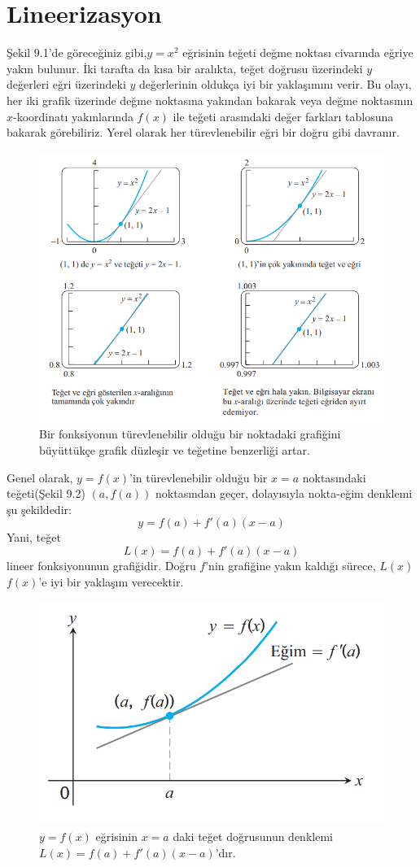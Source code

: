 \section{\protect Lineerizasyon}
Şekil 9.1'de göreceğiniz gibi,$y=x^2$ eğrisinin teğeti değme noktası civarında eğriye yakın bulunur. İki tarafta da kısa bir aralıkta, teğet doğrusu üzerindeki $y$ değerleri eğri üzerindeki $y$ değerlerinin oldukça iyi bir yaklaşımını verir. Bu olayı, her iki grafik üzerinde değme noktasına yakından bakarak veya değme noktasının $x$-koordinatı yakınlarında $f(x)$ ile teğeti arasındaki değer farkları tablosuna bakarak görebiliriz. Yerel olarak her türevlenebilir eğri bir doğru gibi davranır.
\begin{figure}[H]
	\centering
	\includegraphics[width=0.87\linewidth]{lineerizasyon1.png}
	\caption{Bir fonksiyonun türevlenebilir olduğu bir noktadaki grafiğini büyüttükçe grafik düzleşir ve teğetine benzerliği artar.}
	\label{fig:ornekresim}
\end{figure}
Genel olarak, $y=f(x)$'in türevlenebilir olduğu bir $x=a$ noktasındaki teğeti(Şekil 9.2) $(a,f(a))$ noktasından geçer, dolayısıyla nokta-eğim denklemi şu şekildedir:
 	\begin{equation*}
	y=f(a)+f'(a)(x-a)
	\end{equation*}
Yani, teğet
	\begin{equation*}
	L(x)=f(a)+f'(a)(x-a)
	\end{equation*}
lineer fonksiyonunun grafiğidir. Doğru $f$'nin grafiğine yakın kaldığı sürece, $L(x)$ $f(x)$'e iyi bir yaklaşım verecektir.
\begin{figure}[H]
	\centering
	\includegraphics[width=0.5\linewidth]{lineerizasyon2.png}
	\caption{$y=f(x)$ eğrisinin $x=a$ daki teğet doğrusunun denklemi\\ $L(x)=f(a)+f'(a)(x-a)$'dır.}
	\label{fig:ornekresim}
\end{figure}
